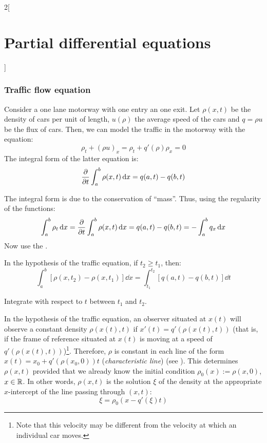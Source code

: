 \documentclass[../../../main_math.tex]{subfiles}
\begin{document}
\begin{multicols}{2}[\section{Partial differential equations}]
  \subsubsection{Traffic flow equation}
  \begin{proposition}
    Consider a one lane motorway with one entry an one exit. Let $\rho(x,t)$ be the density of cars per unit of length, $u(\rho)$ the average speed of the cars and $q=\rho u$ be the flux of cars. Then, we can model the traffic in the motorway with the equation: $$\rho_t+{(\rho u)}_x=\rho_t+q'(\rho){\rho}_x=0$$
    The integral form of the latter equation is:
    \begin{equation}\label{PDE:trafficintegral}
      \pdv{}{t}\int_{a}^b\rho(x,t)\dd{x}=q(a,t)-q(b,t)
    \end{equation}
  \end{proposition}
  \begin{sproof}
    The integral form is due to the conservation of ``mass''. Thus, using the regularity of the functions:
    $$\int_a^b\rho_t\dd{x}=\pdv{}{t}\int_{a}^b\rho(x,t)\dd{x}=q(a,t)-q(b,t)=-\int_a^bq_x\dd{x}$$
    Now use the .
  \end{sproof}
  \begin{proposition}
    In the hypothesis of the traffic equation, if $t_2\geq t_1$, then:
    \begin{equation}\label{PDE:trafficintegral2}
      \int_{a}^b[\rho(x,t_2)-\rho(x,t_1)]\dd{x}=\int_{t_1}^{t_2}[q(a,t)-q(b,t)]\dd{t}
    \end{equation}
  \end{proposition}
  \begin{sproof}
    Integrate  with respect to $t$ between $t_1$ and $t_2$.
  \end{sproof}
  \begin{proposition}
    In the hypothesis of the traffic equation, an observer situated at $x(t)$ will observe a constant density $\rho(x(t),t)$ if $x'(t)=q'(\rho(x(t),t))$ (that is, if the frame of reference situated at $x(t)$ is moving at a speed of $q'(\rho(x(t),t))$)\footnote{Note that this
      velocity may be different from the velocity at which an individual car moves.}. Therefore, $\rho$ is constant in each line of the form $x(t)=x_0+q'(\rho(x_0,0))t$ (\emph{characteristic line}) (see ). This determines $\rho(x,t)$ provided that we already know the initial condition $\rho_0(x):=\rho(x,0)$, $x\in\mathbb{R}$. In other words, $\rho(x,t)$ is the solution $\xi$ of the density at the appropriate $x$-intercept of the line passing through $(x,t)$: $$\xi=\rho_0(x-q'(\xi)t)$$

\end{proposition}
\end{multicols}
\end{document}
